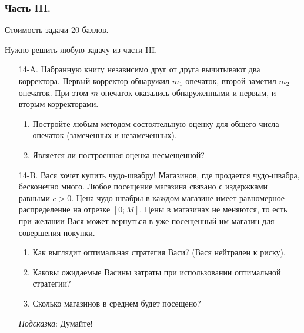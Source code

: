 \subsubsection*{Часть III.}

Стоимость задачи 20 баллов.

Нужно решить любую \textbf{} задачу из части III.

\begin{enumerate}
\item[14-A.] Набранную книгу независимо друг от друга вычитывают два корректора. Первый корректор обнаружил $m_{1}$ опечаток, второй заметил $m_{2}$ опечаток. При этом $m$ опечаток оказались обнаруженными и первым, и вторым корректорами.
\begin{enumerate}
\item Постройте любым методом состоятельную оценку для общего числа опечаток (замеченных и незамеченных).
\item Является ли построенная оценка несмещенной?
\end{enumerate}

\item[14-B.] Вася хочет купить чудо-швабру! Магазинов, где продается чудо-швабра, бесконечно много. Любое посещение магазина связано с издержками равными $c>0$. Цена чудо-швабры в каждом магазине имеет равномерное распределение на отрезке $[0;M]$. Цены в магазинах не меняются, то есть при желании Вася может вернуться в уже посещенный им магазин для совершения покупки.
\begin{enumerate}
\item Как выглядит оптимальная стратегия Васи? (Вася нейтрален к риску).
\item Каковы ожидаемые Васины затраты при использовании оптимальной стратегии?
\item Сколько магазинов в среднем будет посещено?
\end{enumerate}
\emph{Подсказка}: Думайте!
\end{enumerate}
